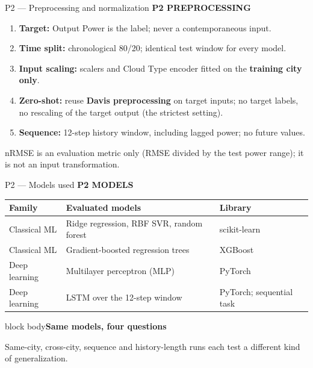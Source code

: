 \documentclass[aspectratio=169,11pt]{beamer}
\newcommand{\sectiontag}[1]{{\footnotesize\usebeamercolor[fg]{structure}\textbf{#1}}\par\vspace{0.10cm}}
\newcommand{\smallmuted}[1]{{\footnotesize\color{slate}#1\par}}
\newcommand{\factbox}[2]{\begin{beamercolorbox}[sep=0.13cm,wd=\linewidth]{block body}{\bfseries #1}\par\small #2\end{beamercolorbox}}
\begin{document}
\begin{frame}{P2 — Preprocessing and normalization}
\sectiontag{P2 \quad PREPROCESSING}
\begin{enumerate}\setlength\itemsep{0.33em}
\item \textbf{Target:} Output Power is the label; never a contemporaneous input.
\item \textbf{Time split:} chronological 80/20; identical test window for every model.
\item \textbf{Input scaling:} scalers and Cloud Type encoder fitted on the \textbf{training city only}.
\item \textbf{Zero-shot:} reuse \textbf{Davis preprocessing} on target inputs; no target labels, no rescaling of the target output (the strictest setting).
\item \textbf{Sequence:} 12-step history window, including lagged power; no future values.
\end{enumerate}
\vspace{0.03cm}
\smallmuted{nRMSE is an evaluation metric only (RMSE divided by the test power range); it is not an input transformation.}
\end{frame}

\begin{frame}{P2 — Models used}
\sectiontag{P2 \quad MODELS}
\renewcommand{\arraystretch}{1.35}
\begin{tabularx}{\linewidth}{@{}P{2.25cm}YP{3.0cm}@{}}\toprule
\textbf{Family} & \textbf{Evaluated models} & \textbf{Library}\\\midrule
{} Classical ML & Ridge regression, RBF SVR, random forest & scikit-learn\\
 Classical ML & Gradient-boosted regression trees & XGBoost\\
 Deep learning & Multilayer perceptron (MLP) & PyTorch\\
 Deep learning & LSTM over the 12-step window & PyTorch; sequential task\\\bottomrule
\end{tabularx}\par
\vspace{0.20cm}
\factbox{Same models, four questions}{Same-city, cross-city, sequence and history-length runs each test a different kind of generalization.}
\end{frame}
\end{document}
